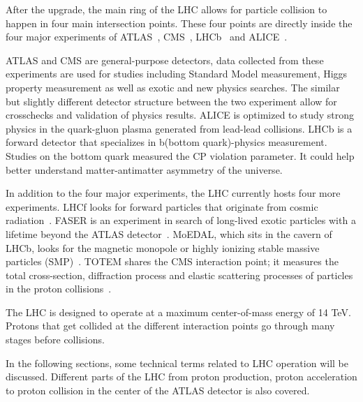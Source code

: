 After the upgrade, the main ring of the LHC allows for particle collision to happen in four main intersection points. These four points are directly inside the four major experiments of ATLAS~\cite{ATLAS:1999vwa}, CMS~\cite{CMS:2006myw}, LHCb~\cite{lhcb2001technical} and ALICE~\cite{Cortese:519145}.

ATLAS and CMS are general-purpose detectors, data collected from these experiments are used for studies including Standard Model measurement, Higgs property measurement as well as exotic and new physics searches. The similar but slightly different detector structure between the two experiment allow for crosschecks and validation of physics results. ALICE is optimized to study strong physics in the quark-gluon plasma generated from lead-lead collisions. LHCb is a forward detector that specializes in b(bottom quark)-physics measurement. Studies on the bottom quark measured the CP violation parameter. It could help better understand matter-antimatter asymmetry of the universe. 

In addition to the four major experiments, the LHC currently hosts four more experiments. LHCf looks for forward particles that originate from cosmic radiation~\cite{Adriani:926196}. FASER is an experiment in search of long-lived exotic particles with a lifetime beyond the ATLAS detector~\cite{Ariga:2651328}. MoEDAL, which sits in the cavern of LHCb, looks for the magnetic monopole or highly ionizing stable massive particles (SMP)~\cite{Pinfold:1181486}. TOTEM shares the CMS interaction point; it measures the total
cross-section, diffraction process and elastic scattering processes of particles in the proton collisions~\cite{TOTEM:2004hps}. 

The LHC is designed to operate at a maximum center-of-mass energy of 14 TeV. Protons that get collided at the different interaction points go through many stages before collisions. 

In the following sections, some technical terms related to LHC operation will be discussed. Different parts of the LHC from proton production, proton acceleration to proton collision in the center of the ATLAS detector is also covered.

